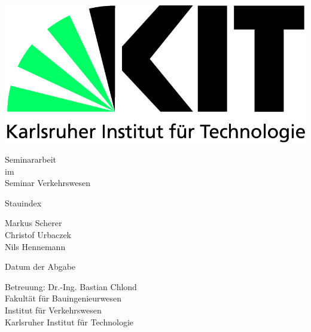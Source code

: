 \documentclass[12pt,a4paper]{scrartcl}
\begin{document}
  \pagestyle{empty}

  \begin{titlepage}

    \includegraphics[scale=0.45]{images/0_kit-logo.jpg} 
    \vspace*{2cm} 

 \begin{center} \large 
    
    Seminararbeit \\
    im \\
    Seminar Verkehrswesen
    
    \vspace*{2cm}

    {\huge Stauindex}
    \vspace*{2.5cm}

    Markus Scherer\\
    Christof Urbaczek\\
    Nils Hennemann
    
    \vspace*{1.0cm}

    Datum der Abgabe %
    \vspace*{2.5cm}

    Betreuung: Dr.-Ing. Bastian Chlond \\[1cm]
    Fakultät für Bauingenieurwesen \\[0.5cm]
    Institut für Verkehrswesen \\[1cm]
    
		Karlsruher Institut für Technologie
  \end{center}
\end{titlepage}



  \tableofcontents

\newpage
 
\end{document}
